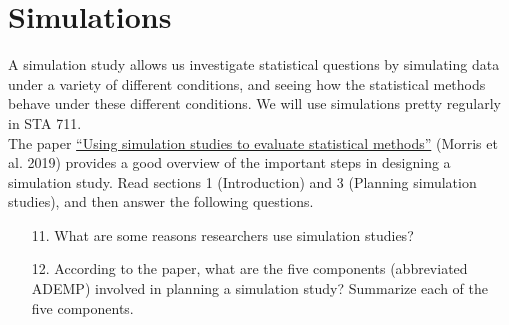 \documentclass[11pt]{article}
\begin{document}
\section{Simulations}

A simulation study allows us investigate statistical questions by simulating data under a variety of different conditions, and seeing how the statistical methods behave under these different conditions. We will use simulations pretty regularly in STA 711.\\

\noindent The paper \href{https://onlinelibrary.wiley.com/doi/10.1002/sim.8086}{“Using simulation studies to evaluate statistical methods”} (Morris et al. 2019) provides a good overview of the important steps in designing a simulation study. Read sections 1 (Introduction) and 3 (Planning simulation studies), and then answer the following questions.

\begin{enumerate}
\item[11.] What are some reasons researchers use simulation studies?

\item[12.] According to the paper, what are the five components (abbreviated ADEMP) involved in planning a simulation study? Summarize each of the five components.
\end{enumerate}
\end{document}

